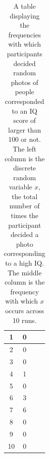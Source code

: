 \documentclass{article}
\begin{document}
\begin{enumerate}
\begin{table}[ht]
\begin{tabular}{| c | c | c | c |}
1 & 0 &  &  \\ \hline
2 & 0 &  &  \\ \hline
3 & 0 &  &  \\ \hline
4 & 1 &  &  \\ \hline
5 & 0 &  &  \\ \hline
6 & 3 &  &  \\ \hline
7 & 6 &  &  \\ \hline
8 & 0 &  &  \\ \hline
9 & 0 &  &  \\ \hline
10 & 0 &  &  \\ \hline
\hline
\end{tabular}
\caption{\label{tab:baby} A table displaying the frequencies with which participants decided random photos of people corresponded to an IQ score of larger than 100 or not.  The left column is the discrete random variable $x$, the total number of times the participant decided a photo corresponding to a high IQ.  The middle column is the frequency with which $x$ occurs across 10 runs.}
\end{table}
\end{enumerate}
\end{document}
